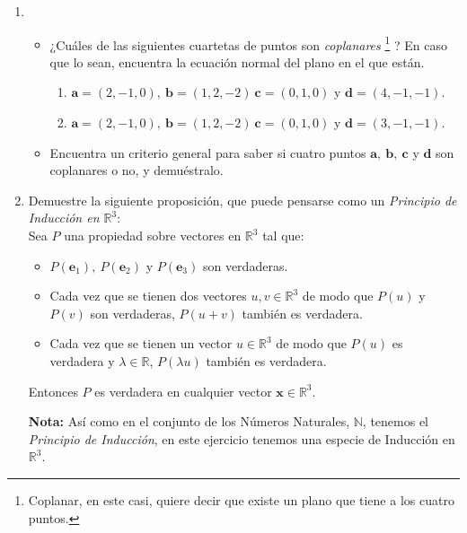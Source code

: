 \documentclass[a4paper, 12pt]{article}
\begin{document}
\begin{enumerate}
\item 
\begin{itemize}
\item ¿Cuáles de las siguientes cuartetas de puntos son \emph{coplanares}%
\footnote{Coplanar, en este casi, quiere decir que existe un plano que tiene a los cuatro puntos.}%
%
? 
En caso que lo sean, encuentra la ecuación normal del plano en el que están. 
\begin{enumerate}
    \item $\mathbf{a} = (2, - 1, 0),\ \mathbf{b} = (1, 2,- 2)\ \mathbf{c} = (0, 1, 0)$ y $\mathbf{d} = (4, -1, - 1)$.
    \item $\mathbf{a} = (2, - 1, 0),\ \mathbf{b} = (1, 2,- 2)\ \mathbf{c} = (0, 1, 0)$ y $\mathbf{d} = (3, -1, - 1)$.
\end{enumerate} 
\item Encuentra un criterio general para saber si cuatro puntos $\mathbf{a},\ \mathbf{b},\ \mathbf{c}$ y $\mathbf{d}$ son coplanares o no, y demuéstralo. 
\end{itemize} 

\item Demuestre la siguiente proposición, que puede pensarse como un \emph{Principio de Inducción en $\mathbb{R}^3$}: 
\\
Sea $P$ una propiedad sobre vectores en $\mathbb{R}^3$ tal que:
\begin{itemize}
    \item $P(\mathbf{e}_{1}),\ P(\mathbf{e}_{2})$ y $P(\mathbf{e}_{3})$ son verdaderas. 
    \item Cada vez que se tienen dos vectores $u, v \in \mathbb{R}^3$ de modo que $P(u)$ y $P(v)$ son verdaderas, $P(u + v)$ también es verdadera. 
    \item Cada vez que se tienen un vector $u\in \mathbb{R}^3$ de modo que $P(u)$ es verdadera y $\lambda \in \mathbb{R}$, $P(\lambda u)$ también es verdadera. 
\end{itemize} 
Entonces $P$ es verdadera en cualquier vector $\mathbf{x} \in \mathbb{R}^3$. 

\textbf{Nota:} Así como en el conjunto de los Números Naturales, $\mathbb{N}$, tenemos el \emph{Principio de Inducción}, en este ejercicio tenemos una especie de Inducción en $\mathbb{R}^3$. 


\end{enumerate}
\end{document}
